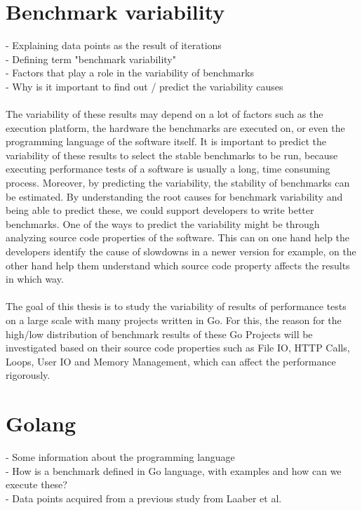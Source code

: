 \documentclass{seal_thesis}
\begin{document}
\section{Benchmark variability}
- Explaining data points as the result of iterations \\
- Defining term "benchmark variability" \\
- Factors that play a role in the variability of benchmarks\\
- Why is it important to find out / predict the variability causes \\
\\
The variability of these results may depend on a lot of factors such as the execution platform,
the hardware the benchmarks are executed on, or even the programming language of the
software itself. It is important to predict the variability of these results to select the stable
benchmarks to be run, because executing performance tests of a software is usually a long,
time consuming process. Moreover, by predicting the variability, the stability of benchmarks can
be estimated. By understanding the root causes for benchmark variability and being able to predict these, we could support developers to write better benchmarks. One of the ways to predict the variability might be through analyzing source code properties of the software. This can on one hand help the developers identify the cause of slowdowns in a newer version for example, on the other hand help them understand which source code property affects the
results in which way.\\
\\
The goal of this thesis is to study the variability of results of performance tests on a large scale with many projects written in Go. For this, the reason for the high/low distribution of benchmark results of these Go Projects will be investigated based on their source code properties such as File IO, HTTP Calls, Loops, User IO and Memory Management, which can affect the performance rigorously.


\section{Golang}
- Some information about the programming language \\
- How is a benchmark defined in Go language, with examples and how can we execute these? \\
- Data points acquired from a previous study from Laaber et al. \\
\end{document}
